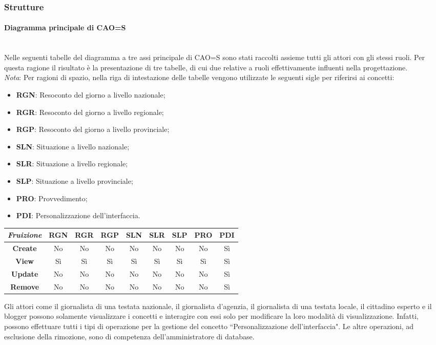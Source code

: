 \subsubsection{Strutture}

\paragraph{Diagramma principale di CAO=S}\mbox{}\\
Nelle seguenti tabelle del diagramma a tre assi principale di CAO=S sono stati raccolti assieme tutti gli attori con gli stessi ruoli.
Per questa ragione il risultato è la presentazione di tre tabelle, di cui due relative a ruoli effettivamente influenti nella progettazione.\\
\textit{Nota}: Per ragioni di spazio, nella riga di intestazione delle tabelle vengono utilizzate le seguenti sigle per riferirsi ai concetti:
\begin{itemize}
    \item \textbf{RGN}: Resoconto del giorno a livello nazionale;
    \item \textbf{RGR}: Resoconto del giorno a livello regionale;
    \item \textbf{RGP}: Resoconto del giorno a livello provinciale;
    \item \textbf{SLN}: Situazione a livello nazionale;
    \item \textbf{SLR}: Situazione a livello regionale;
    \item \textbf{SLP}: Situazione a livello provinciale;
    \item \textbf{PRO}: Provvedimento;
    \item \textbf{PDI}: Personalizzazione dell'interfaccia.
\end{itemize}

{
\renewcommand{\arraystretch}{2}
\begin{longtable}[h]{| c | c | c | c | c | c | c | c | c |}
    \hline
    \textit{Fruizione} & \textbf{RGN} & \textbf{RGR} & \textbf{RGP} & \textbf{SLN} & \textbf{SLR} & \textbf{SLP} & \textbf{PRO} & \textbf{PDI} \\
    \hline
    \endhead
    \textbf{Create} & No & No & No & No & No & No & No & Sì \\
    \hline
    \textbf{View}   & Sì & Sì & Sì & Sì & Sì & Sì & Sì & Sì \\
    \hline
    \textbf{Update} & No & No & No & No & No & No & No & Sì \\
    \hline
    \textbf{Remove} & No & No & No & No & No & No & No & Sì \\
    \hline
\end{longtable}
}
\noindent
Gli attori come il giornalista di una testata nazionale, il giornalista d'agenzia, il giornalista di una testata locale, il cittadino esperto e il blogger possono solamente visualizzare i concetti e interagire con essi solo per modificare la loro modalità di visualizzazione.
Infatti, possono effettuare tutti i tipi di operazione per la gestione del concetto ``Personalizzazione dell'interfaccia".
Le altre operazioni, ad esclusione della rimozione, sono di competenza dell'amministratore di database.

